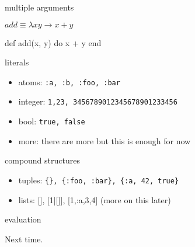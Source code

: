 \begin{frame}{multiple arguments}

  $add \equiv \lambda x y \rightarrow x + y$
  \pause

  \begin{code}
    def add(x, y) do
       x + y
    end
  \end{code}

\end{frame}

\begin{frame}{literals}
 \begin{itemize}
  \pause \item {atoms:} {\tt :a, :b, :foo, :bar}
  \pause \item {integer:} {\tt 1,23, 3456789012345678901233456}
  \pause \item {bool:} {\tt true, false}
  \pause \item {more:} there are more but this is enough for now
 \end{itemize}
\end{frame}


\begin{frame}{compound structures}
 \begin{itemize}
  \pause \item {tuples:} {\tt \{\}, \{:foo, :bar\}, \{:a, 42, true\}}
  \pause \item {lists:} [], [1|[]], [1,:a,3,4]  (more on this later)
 \end{itemize}
\end{frame}

\begin{frame}{evaluation}

\pause
\vspace{100pt}\hspace{100pt}Next time.

\end{frame}



